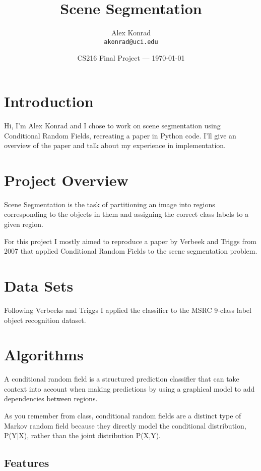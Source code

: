 \documentclass{article}
\title{Scene Segmentation}
\author{Alex Konrad\\ \texttt{akonrad@uci.edu}}
\date{CS216 Final Project --- \today}
\begin{document}
\maketitle
\section*{Introduction}

Hi, I’m Alex Konrad and I chose to work on scene segmentation using
Conditional Random Fields, recreating a paper in Python code. I'll give
an overview of the paper and talk about my experience in implementation.

\section{Project Overview}

Scene Segmentation is the task of partitioning an image into regions
corresponding to the objects in them and assigning the correct class
labels to a given region.

For this project I mostly aimed to reproduce a paper by Verbeek and
Triggs from 2007 that applied Conditional Random Fields to the
scene segmentation problem.

\section{Data Sets}

Following Verbeeks and Triggs I applied the classifier
to the MSRC 9-class label object recognition dataset.

\section{Algorithms} 

A conditional random field is a structured prediction classifier that
can take context into account when making predictions by using a
graphical model to add dependencies between regions.

As you remember from class, conditional random fields are a distinct
type of Markov random field because they directly model the conditional
distribution, P(Y|X), rather than the joint distribution P(X,Y). 



\subsection{Features}
\end{document}
